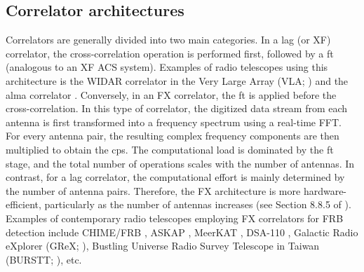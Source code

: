 \subsection{Correlator architectures}
\label{sec:spectrometer_architectures}
Correlators are generally divided into two main categories. In a lag (or XF) correlator, the cross-correlation operation is performed first, followed by a \gls{ft} (analogous to an XF ACS system). Examples of radio telescopes using this architecture is the WIDAR correlator in the Very Large Array (VLA; \citealt{Perley_2009}) and the \gls{alma} correlator \citep{ALMA_correlator}.
Conversely, in an FX correlator, the \gls{ft} is applied before the cross-correlation. In this type of correlator, the digitized data stream from each antenna is first transformed into a frequency spectrum using a real-time FFT. For every antenna pair, the resulting complex frequency components are then multiplied to obtain the \gls{cps}. The computational load is dominated by the \gls{ft} stage, and the total number of operations scales with the number of antennas. In contrast, for a lag correlator, the computational effort is mainly determined by the number of antenna pairs. Therefore, the FX architecture is more hardware-efficient, particularly as the number of antennas increases (see Section 8.8.5 of \citealt{thompson2017interferometry}). Examples of contemporary radio telescopes employing FX correlators for FRB detection include CHIME/FRB \citep{CHIME/FRB_2018}, ASKAP \citep{Shannon_2025}, MeerKAT \citep{MeerKAT}, DSA-110 \citep{DSA110_Ravi_2023}, Galactic Radio eXplorer (GReX; \citealt{GReX}), Bustling Universe Radio Survey Telescope in Taiwan (BURSTT; \citealt{BURSTT}), etc.

